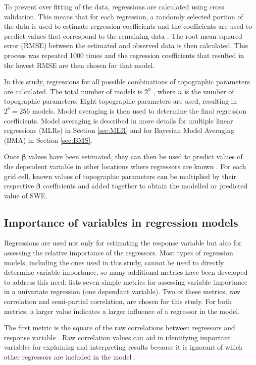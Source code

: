 \documentclass{sfuthesis}
\begin{document}
To prevent over fitting of the data, regressions are calculated using cross validation. This means that for each regression, a randomly selected portion of the data is used to estimate regression coefficients and the coefficients are used to predict values that correspond to the remaining data \citep{Kohavi1995}. The root mean squared error (RMSE) between the estimated and observed data is then calculated. This process was repeated 1000 times and the regression coefficients that resulted in the lowest RMSE are then chosen for that model. 

In this study, regressions for all possible combinations of topographic parameters are calculated. The total number of models is $2^n$ , where $n$ is the number of topographic parameters. Eight topographic parameters are used, resulting in $2^8 = 256$ models. Model averaging is then used to determine the final regression coefficients. Model averaging is described in more details for multiple linear regressions (MLRs) in Section \ref{sec:MLR} and for Bayesian Model Averaging (BMA) in Section \ref{sec:BMS}.

Once $\bm{\beta}$ values have been estimated, they can then be used to predict values of the dependent variable in other locations where regressors are known \citep{Davis1986}. For each grid cell, known values of topographic parameters can be multiplied by their respective $\bm{\beta}$ coefficients and added together to obtain the modelled or predicted value of SWE.

\subsection{Importance of variables in regression models}

Regressions are used not only for estimating the response variable but also for assessing the relative importance of the regressors. Most types of regression models, including the ones used in this study, cannot be used to directly determine variable importance, so many additional metrics have been developed to address this need. \cite{Gromping2015} lists seven simple metrics for assessing variable importance in a univariate regression (one dependant variable). Two of these metrics, raw correlation and semi-partial correlation, are chosen for this study. For both metrics, a larger value indicates a larger influence of a regressor in the model.

The first metric is the square of the raw correlations between regressors and response variable \citep{Gromping2015}. Raw correlation values can aid in identifying important variables for explaining and interpreting results because it is ignorant of which other regressors are included in the model \citep{Darlington1968}. 
\end{document}
